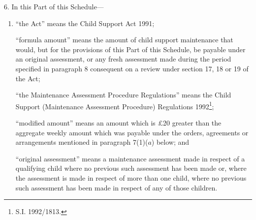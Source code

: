 \documentclass[a4paper]{article}
\newcommand{\parthead}{}
\begin{document}
\renewcommand\parthead{--- Schedule Part II}

6.  In this Part of this Schedule—
\begin{enumerate}\item[]
“the Act” means the Child Support Act 1991;

“formula amount” means the amount of child support maintenance that would, but for the provisions of this Part of this Schedule, be payable under an original assessment, or any fresh assessment made during the period specified in paragraph 8 consequent on a review under section 17, 18 or 19 of the Act;

“the Maintenance Assessment Procedure Regulations” means the Child Support (Maintenance Assessment Procedure) Regulations 1992\footnote{\frenchspacing S.I. 1992/1813.};

“modified amount” means an amount which is £20 greater than the aggregate weekly amount which was payable under the orders, agreements or arrangements mentioned in paragraph 7(1)($a$) below; and

“original assessment” means a maintenance assessment made in respect of a qualifying child where no previous such assessment has been made or, where the assessment is made in respect of more than one child, where no previous such assessment has been made in respect of any of those children.
\end{enumerate}

\medskip
\end{document}
